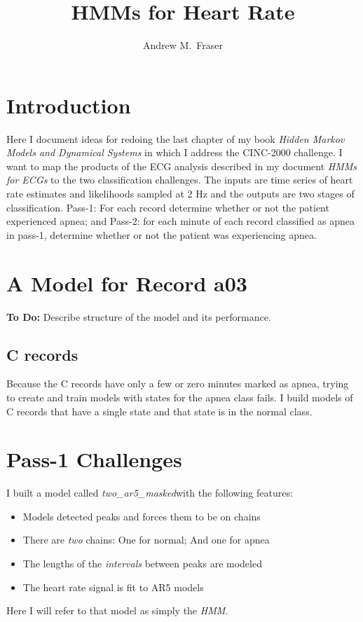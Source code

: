\documentclass[12pt]{article}
\title{HMMs for Heart Rate}
\author{Andrew M.\ Fraser}
\newcommand{\BestModel}{\emph{two\_ar5\_masked}}
\begin{document}
\maketitle

\section{Introduction}
\label{sec:introduction}

Here I document ideas for redoing the last chapter of my book
\emph{Hidden Markov Models and Dynamical Systems} in which I address
the CINC-2000 challenge.  I want to map the products of the ECG
analysis described in my document \emph{HMMs for ECGs} to the two
classification challenges.  The inputs are time series of heart rate
estimates and likelihoods sampled at 2 Hz and the outputs are two
stages of classification.  Pass-1: For each record determine whether
or not the patient experienced apnea; and Pass-2: for each minute of
each record classified as apnea in pass-1, determine whether or not
the patient was experiencing apnea.

\section{A Model for Record a03}
\label{sec:a03}

\textbf{To Do:}  Describe structure of the model and its performance.

\subsection{C records}
\label{sec:c_records}

Because the C records have only a few or zero minutes marked as apnea,
trying to create and train models with states for the apnea class
fails.  I build models of C records that have a single state and that
state is in the normal class.

\section{Pass-1 Challenges}
\label{sec:pass-1}

I built a model called \BestModel with the following
features:
\begin{itemize}
\item Models detected peaks and forces them to be on chains
\item There are \emph{two} chains: One for normal; And one for apnea
\item The lengths of the \emph{intervals} between peaks are modeled
\item The heart rate signal is fit to AR5 models
\end{itemize}
Here I will refer to that model as simply the \emph{HMM}.
\end{document}
